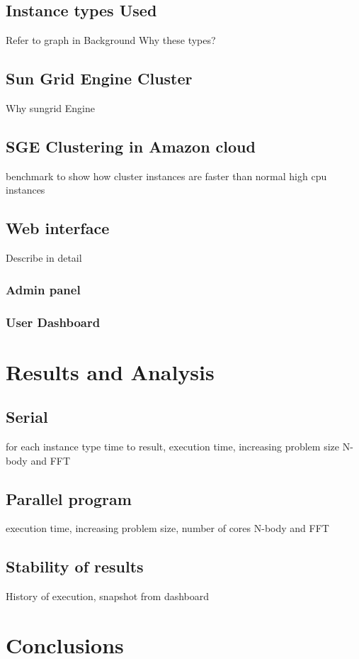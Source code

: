 \documentclass[12pt,a4paper]{report}
\begin{document}
\section{Instance types Used}
Refer to graph in Background
Why these types?
\section{Sun Grid Engine Cluster}
Why sungrid Engine
\section{SGE Clustering in Amazon cloud}
  benchmark to show how cluster instances are faster than normal high cpu instances
\section{Web interface}
Describe in detail
\subsection{Admin panel}
\subsection{User Dashboard}

\chapter{Results and Analysis}
\section{Serial}
for each instance type
time to result, execution time, increasing problem size
N-body and FFT

\section{Parallel program}
execution time, increasing problem size, number of cores
N-body and FFT
\section{Stability of results}
History of execution, snapshot from dashboard

\chapter{Conclusions}
\end{document}
